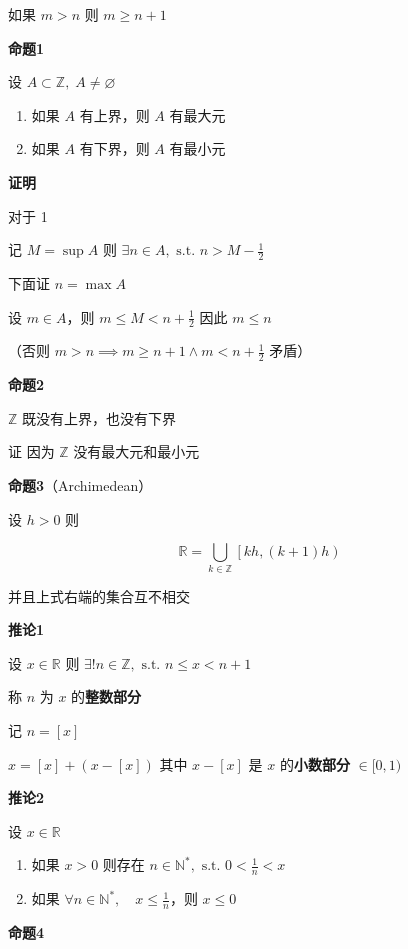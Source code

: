 如果 \(m>n\) 则 \(m \geq n+1\)

\textbf{命题1}

设 \(A\subset \mathbb{Z}, \; A \neq \varnothing\)

\begin{enumerate}
\def\labelenumi{\arabic{enumi}.}
\tightlist
\item
  如果 \(A\) 有上界，则 \(A\) 有最大元
\item
  如果 \(A\) 有下界，则 \(A\) 有最小元
\end{enumerate}

\textbf{证明}

对于 1

记 \(M=\sup A\) 则 \(\exists n \in A, \text{ s.t. } n > M-\frac{1}{2}\)

下面证 \(n=\max A\)

设 \(m\in A\)，则 \(m\leq M<n+\frac{1}{2}\) 因此 \(m\leq n\)

（否则 \(m>n \implies m\geq n+1 \wedge m<n+\frac{1}{2}\) 矛盾）

\textbf{命题2}

\(\mathbb{Z}\) 既没有上界，也没有下界

证 因为 \(\mathbb{Z}\) 没有最大元和最小元

\textbf{命题3}（Archimedean）

设 \(h>0\) 则

\[
\mathbb{R} = \bigcup_{k\in\mathbb{Z}} \left[kh, (k+1)h\right)
\]

并且上式右端的集合互不相交

\textbf{推论1}

设 \(x \in \mathbb{R}\) 则
\(\exists !  n \in \mathbb{Z}, \text{ s.t. } n\leq x <n+1\)

称 \(n\) 为 \(x\) 的\textbf{整数部分}

记 \(n=[x]\)

\(x=[x]+(x-[x])\) 其中 \(x-[x]\) 是 \(x\) 的\textbf{小数部分}
\(\in [0, 1)\)

\textbf{推论2}

设 \(x \in \mathbb{R}\)

\begin{enumerate}
\def\labelenumi{\arabic{enumi}.}
\tightlist
\item
  如果 \(x>0\) 则存在
  \(n\in \mathbb{N}^*, \text{ s.t. } 0<\frac{1}{n}<x\)
\item
  如果 \(\forall n \in \mathbb{N}^*,\quad x\leq \frac{1}{n}\)，则
  \(x\leq 0\)
\end{enumerate}

\textbf{命题4}

